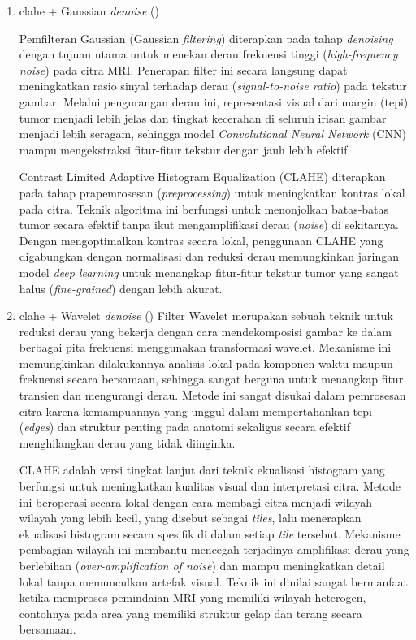 \begin{enumerate}
	\item clahe + Gaussian \textit{denoise} (\textcite{putra2025enhanced})
	
	Pemfilteran Gaussian (Gaussian \textit{filtering}) diterapkan pada tahap \textit{denoising} dengan tujuan utama untuk menekan derau frekuensi tinggi (\textit{high-frequency noise}) pada citra MRI. Penerapan filter ini secara langsung dapat meningkatkan rasio sinyal terhadap derau (\textit{signal-to-noise ratio}) pada tekstur gambar. Melalui pengurangan derau ini, representasi visual dari margin (tepi) tumor menjadi lebih jelas dan tingkat kecerahan di seluruh irisan gambar menjadi lebih seragam, sehingga model \textit{Convolutional Neural Network} (CNN) mampu mengekstraksi fitur-fitur tekstur dengan jauh lebih efektif.
	
	Contrast Limited Adaptive Histogram Equalization (CLAHE) diterapkan pada tahap prapemrosesan (\textit{preprocessing}) untuk meningkatkan kontras lokal pada citra. Teknik algoritma ini berfungsi untuk menonjolkan batas-batas tumor secara efektif tanpa ikut mengamplifikasi derau (\textit{noise}) di sekitarnya. Dengan mengoptimalkan kontras secara lokal, penggunaan CLAHE yang digabungkan dengan normalisasi dan reduksi derau memungkinkan jaringan model \textit{deep learning} untuk menangkap fitur-fitur tekstur tumor yang sangat halus (\textit{fine-grained}) dengan lebih akurat.
		
	\item clahe + Wavelet \textit{denoise} (\textcite{flower2025performance})
	Filter Wavelet merupakan sebuah teknik untuk reduksi derau yang bekerja dengan cara mendekomposisi gambar ke dalam berbagai pita frekuensi menggunakan transformasi wavelet. Mekanisme ini memungkinkan dilakukannya analisis lokal pada komponen waktu maupun frekuensi secara bersamaan, sehingga sangat berguna untuk menangkap fitur transien dan mengurangi derau. Metode ini sangat disukai dalam pemrosesan citra karena kemampuannya yang unggul dalam mempertahankan tepi (\textit{edges}) dan struktur penting pada anatomi sekaligus secara efektif menghilangkan derau yang tidak diinginka.
	
	CLAHE adalah versi tingkat lanjut dari teknik ekualisasi histogram yang berfungsi untuk meningkatkan kualitas visual dan interpretasi citra. Metode ini beroperasi secara lokal dengan cara membagi citra menjadi wilayah-wilayah yang lebih kecil, yang disebut sebagai \textit{tiles}, lalu menerapkan ekualisasi histogram secara spesifik di dalam setiap \textit{tile} tersebut. Mekanisme pembagian wilayah ini membantu mencegah terjadinya amplifikasi derau yang berlebihan (\textit{over-amplification of noise}) dan mampu meningkatkan detail lokal tanpa memunculkan artefak visual. Teknik ini dinilai sangat bermanfaat ketika memproses pemindaian MRI yang memiliki wilayah heterogen, contohnya pada area yang memiliki struktur gelap dan terang secara bersamaan.
\end{enumerate}

